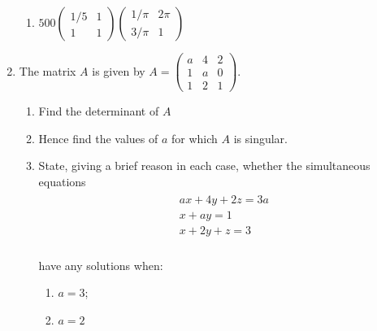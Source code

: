 \begin{enumerate}
\begin{enumerate}
\item 

\(500\begin{pmatrix} 1 / 5 & 1\\1 & 1\end{pmatrix}\begin{pmatrix} 1 / \pi & 2\pi\\3/\pi & 1\end{pmatrix}\)

\end{enumerate}

\item 

The matrix \(A\) is given by \(A=\begin{pmatrix}a & 4 & 2\\ 1 & a & 0\\ 1 & 2 & 1\end{pmatrix}\).
\begin{enumerate}

\item 

Find the determinant of \(A\)

\item 

Hence find the values of \(a\) for which \(A\) is singular.

\item 

State, giving a brief reason in each case, whether the simultaneous equations
\begin{equation*}
\begin{split}
          \begin{array}{l}
              a x + 4y + 2z= 3a\\
              x + a y = 1\\
              x + 2y + z = 3\\
          \end{array}
      \end{split}
\end{equation*}

have any solutions when:
\begin{enumerate}

\item 

\(a = 3\);

\item 

\(a = 2\)

\end{enumerate}


\end{enumerate}
\end{enumerate}

